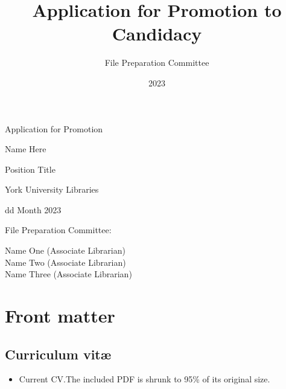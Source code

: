 \documentclass[12pt,oneside]{book}
\title{Application for Promotion to Candidacy}
\author{File Preparation Committee}
\date{2023}
\begin{document}
\frontmatter

\begin{titlepage}

  \null\vfill

  \begin{center}

    {\Huge
      Application for Promotion
    }
    \vspace{2cm}

    {\Large
      Name Here
    }
    \vspace{1cm}

  {\large
    Position Title

    York University Libraries

    \vspace{1cm}

    dd Month 2023

  }

\end{center}

\vfill
\vfill

{\large
  File Preparation Committee:

  Name One (Associate Librarian) \\
  \indent Name Two (Associate Librarian) \\
  \indent Name Three (Associate Librarian)
}

\hfill

\end{titlepage}



\tableofcontents

\mainmatter{}

\chapter{Front matter}


\section{Curriculum vit\ae}

\begin{itemize}
  \item Current CV.\@  The included PDF is shrunk to 95\% of its original size.
\end{itemize}
\end{document}
